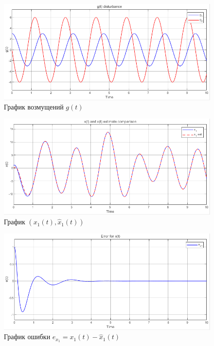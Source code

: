 \documentclass[a4paper, 12pt]{article}
\begin{document}
    \begin{figure}[H]
        \centering
        \includegraphics[scale=0.75]{2task_g.png}
        \captionsetup{skip=0pt}
        \caption{График возмущений $g(t)$}
        \label{fig:2task_g}
    \end{figure}
    \begin{figure}[H]
        \centering
        \includegraphics[scale=0.75]{2task_x1.png}
        \captionsetup{skip=0pt}
        \caption{График $(x_1(t),\hat{x}_1(t))$}
        \label{fig:2task_x1}
    \end{figure}
    \begin{figure}[H]
        \centering
        \includegraphics[scale=0.75]{2task_ex1.png}
        \captionsetup{skip=0pt}
        \caption{График ошибки $e_{x_1}=x_1(t)-\hat{x}_1(t)$}
        \label{fig:2task_ex1}
    \end{figure}
\end{document}
